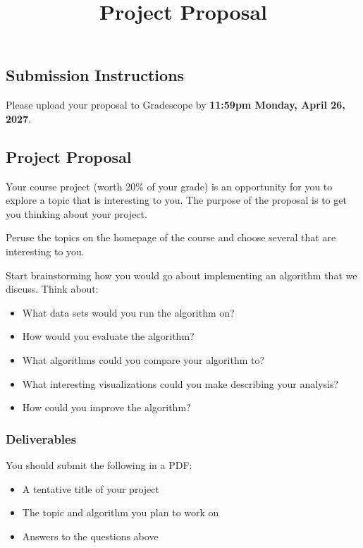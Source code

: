 \documentclass{article}
\title{Project Proposal}
\author{} %
\date{}
\begin{document}
\maketitle

\subsection*{Submission Instructions}
Please upload your proposal to Gradescope by \textbf{11:59pm Monday, April 26, 2027}.

\subsection*{Project Proposal}

Your course project (worth 20\% of your grade) is an opportunity for you to explore a topic that is interesting to you.
The purpose of the proposal is to get you thinking about your project.

Peruse the topics on the homepage of the course and choose several that are interesting to you.

Start brainstorming how you would go about implementing an algorithm that we discuss.
Think about:
\begin{itemize}
    \item What data sets would you run the algorithm on?
    \item How would you evaluate the algorithm?
    \item What algorithms could you compare your algorithm to?
    \item What interesting visualizations could you make describing your analysis?
    \item How could you improve the algorithm?
\end{itemize}

\subsubsection*{Deliverables}

You should submit the following in a PDF:
\begin{itemize}
    \item A tentative title of your project
    \item The topic and algorithm you plan to work on
    \item Answers to the questions above 
\end{itemize}
\end{document}
